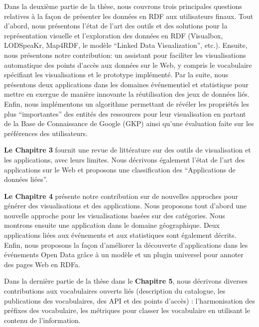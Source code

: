 Dans la deuxi\`{e}me partie de la th\`{e}se, nous couvrons trois principales questions relatives \`{a} la fa\c{c}on de pr\'{e}senter les donn\'{e}es en RDF aux utilisateurs finaux. Tout d'abord, nous pr\'{e}sentons l'\'{e}tat de l'art des outils et des solutions pour la repr\'{e}sentation visuelle et l'exploration des donn\'{e}es en RDF (Visualbox, LODSpeaKr, Map4RDF, le mod\`{e}le ``Linked Data Visualization'', etc.). Ensuite, nous pr\'{e}sentons notre contribution: un assistant pour faciliter les visualisations automatique des points d'acc\`{e}s aux donn\'{e}es sur le Web, y compris le vocabulaire sp\'{e}cifiant les visualisations et le prototype impl\'{e}ment\'{e}. Par la suite, nous pr\'{e}sentons deux applications dans les domaines \'{e}v\'{e}nementiel et statistique pour mettre en exergue de mani\`{e}re innovante la r\'{e}utilisation des jeux de donn\'{e}es li\'{e}s. Enfin, nous impl\'{e}mentons un algorithme permettant de r\'{e}v\'{e}ler les propri\'{e}t\'{e}s les plus ``importantes'' des entit\'{e}s des ressources pour leur visualisation en partant de la Base de Connaissance de Google (GKP) ainsi qu'une \'{e}valuation faite sur les pr\'{e}f\'{e}rences des utilisateurs.

\textbf{Le Chapitre 3} fournit une revue de litt\'{e}rature sur des outils de visualisation et les applications, avec leurs limites. Nous d\'{e}crivons \'{e}galement l'\'{e}tat de l'art des applications sur le Web et proposons une classification des ``Applications de donn\'{e}es li\'{e}es''.

\textbf{Le Chapitre 4} pr\'{e}sente notre contribution sur de nouvelles approches pour g\'{e}n\'{e}rer des visualisations et des applications. Nous proposons tout d'abord une nouvelle approche pour les visualisations bas\'{e}es sur des cat\'{e}gories. Nous montrons ensuite une application dans le domaine g\'{e}ographique. Deux applications li\'{e}es aux \'{e}v\'{e}nements et aux statistiques sont \'{e}galement d\'{e}crits. Enfin, nous proposons la fa\c{c}on d'am\'{e}liorer la d\'{e}couverte d'applications dans les \'{e}v\'{e}nements Open Data gr\^{a}ce \`{a} un mod\`{e}le et un plugin universel pour annoter des pages Web en RDFa.

Dans la derni\`{e}re partie de la th\`{e}se dans le \textbf{Chapitre 5}, nous d\'{e}crivons diverses contributions aux vocabulaires ouverts li\'{e}s (description du catalogue, les publications des vocabulaires, des API et des points d'acc\`{e}s) : l'harmonisation des pr\'{e}fixes des vocabulaire, les m\'{e}triques pour classer les vocabulaire  en utilisant le contenu de l'information.

